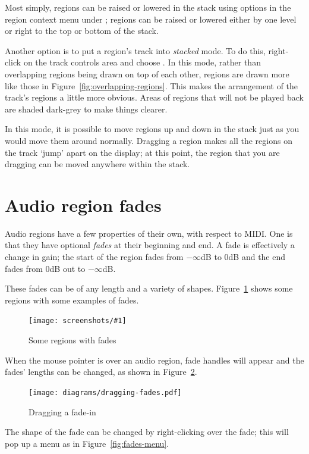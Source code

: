 \documentclass[10pt,a4paper]{book}
\newcommand{\menu}[1]{\emph{\StrSubstitute{#1}{,}{ $\rightarrow$ }}}
\newcommand{\screenshot}[3]{%
\begin{figure}[ht]%
\begin{center}
\texttt{[image: screenshots/\#1]}
\end{center}
\caption{#2}
\label{#3}
\end{figure}}
\begin{document}
Most simply, regions can be raised or lowered in the stack using
options in the region context menu under \menu{Layering}; regions can
be raised or lowered either by one level or right to the top or bottom
of the stack.

Another option is to put a region's track into \emph{stacked} mode.
To do this, right-click on the track controls area and choose
\menu{Layers,Stacked}.  In this mode, rather than overlapping regions
being drawn on top of each other, regions are drawn more like those in
Figure~\ref{fig:overlapping-regions}.  This makes the arrangement of
the track's regions a little more obvious.  Areas of regions that will
not be played back are shaded dark-grey to make things clearer.

In this mode, it is possible to move regions up and down in the stack
just as you would move them around normally.  Dragging a region makes
all the regions on the track `jump' apart on the display; at this
point, the region that you are dragging can be moved anywhere within
the stack.



\section{Audio region fades}

Audio regions have a few properties of their own, with respect to
MIDI\@.  One is that they have optional \emph{fades} at their
beginning and end.  A fade is effectively a change in gain; the start
of the region fades from $-\infty$dB to $0$dB and the end fades from
$0$dB out to $-\infty$dB.  

These fades can be of any length and a variety of shapes.
Figure~\ref{fig:region-fades} shows some regions with some examples of fades.

\screenshot{region-fades.png}{Some regions with fades}{fig:region-fades}

When the mouse pointer is over an audio region, fade handles will
appear and the fades' lengths can be changed, as shown in
Figure~\ref{fig:dragging-fades}.

\begin{figure}[ht]
\begin{center}
\texttt{[image: diagrams/dragging-fades.pdf]}
\end{center}
\caption{Dragging a fade-in}
\label{fig:dragging-fades}
\end{figure}

The shape of the fade can be changed by right-clicking over the fade;
this will pop up a menu as in Figure~\ref{fig:fades-menu}.
\end{document}

